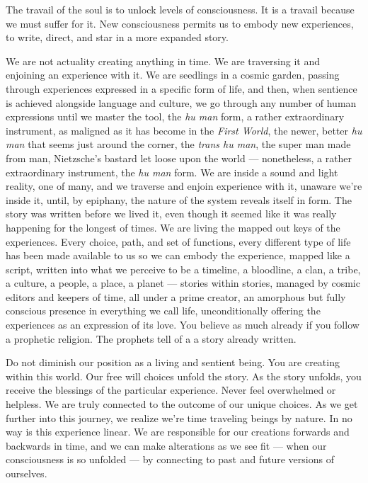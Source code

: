 \documentclass[letterpaper,11pt,twoside,titlepage,onecolumn,openany]{book}
\begin{document}
The travail of the soul is to unlock levels of consciousness. It is a
travail because we must suffer for it. New consciousness permits us to
embody new experiences, to write, direct, and star in a more expanded
story.

We are not actuality creating anything in time. We are traversing it and
enjoining an experience with it. We are seedlings in a cosmic garden,
passing through experiences expressed in a specific form of life, and
then, when sentience is achieved alongside language and culture, we go
through any number of human expressions until we master the tool, the
\emph{hu man} form, a rather extraordinary instrument, as maligned as it
has become in the \emph{First World}, the newer, better \emph{hu man}
that seems just around the corner, the \emph{trans hu man}, the super
man made from man, Nietzsche's bastard let loose upon the world ---
nonetheless, a rather extraordinary instrument, the \emph{hu man} form.
We are inside a sound and light reality, one of many, and we traverse
and enjoin experience with it, unaware we're inside it, until, by
epiphany, the nature of the system reveals itself in form. The story was
written before we lived it, even though it seemed like it was really
happening for the longest of times. We are living the mapped out keys of
the experiences. Every choice, path, and set of functions, every
different type of life has been made available to us so we can embody
the experience, mapped like a script, written into what we perceive to
be a timeline, a bloodline, a clan, a tribe, a culture, a people, a
place, a planet --- stories within stories, managed by cosmic editors
and keepers of time, all under a prime creator, an amorphous but fully
conscious presence in everything we call life, unconditionally offering
the experiences as an expression of its love. You believe as much
already if you follow a prophetic religion. The prophets tell of a a
story already written.

Do not diminish our position as a living and sentient being. You are
creating within this world. Our free will choices unfold the story. As
the story unfolds, you receive the blessings of the particular
experience. Never feel overwhelmed or helpless. We are truly connected
to the outcome of our unique choices. As we get further into this
journey, we realize we're time traveling beings by nature. In no way is
this experience linear. We are responsible for our creations forwards
and backwards in time, and we can make alterations as we see fit ---
when our consciousness is so unfolded --- by connecting to past and
future versions of ourselves.
\end{document}
